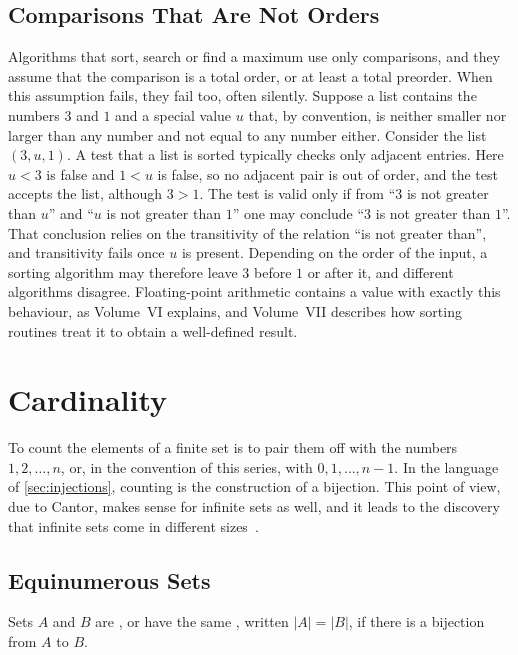 \subsection{Comparisons That Are Not Orders}

Algorithms that sort, search or find a maximum use only comparisons, and they assume that the comparison is a total order, or at least a total preorder. When this assumption fails, they fail too, often silently. Suppose a list contains the numbers $3$ and $1$ and a special value $u$ that, by convention, is neither smaller nor larger than any number and not equal to any number either. Consider the list $(3,u,1)$. A test that a list is sorted typically checks only adjacent entries. Here $u<3$ is false and $1<u$ is false, so no adjacent pair is out of order, and the test accepts the list, although $3>1$. The test is valid only if from ``$3$ is not greater than $u$'' and ``$u$ is not greater than $1$'' one may conclude ``$3$ is not greater than $1$''. That conclusion relies on the transitivity of the relation ``is not greater than'', and transitivity fails once $u$ is present. Depending on the order of the input, a sorting algorithm may therefore leave $3$ before $1$ or after it, and different algorithms disagree. Floating-point arithmetic contains a value with exactly this behaviour, as Volume~VI explains, and Volume~VII describes how sorting routines treat it to obtain a well-defined result.

\section{Cardinality}
\label{sec:cardinality}

To count the elements of a finite set is to pair them off with the numbers $1,2,\ldots,n$, or, in the convention of this series, with $0,1,\ldots,n-1$. In the language of \cref{sec:injections}, counting is the construction of a bijection. This point of view, due to Cantor, makes sense for infinite sets as well, and it leads to the discovery that infinite sets come in different sizes~\cite{cantor1874,cantor1891}.

\subsection{Equinumerous Sets}

\begin{definition}
\label{def:equinumerous}
Sets $A$ and $B$ are , or have the same , written $|A|=|B|$, if there is a bijection from $A$ to $B$.
\end{definition}

